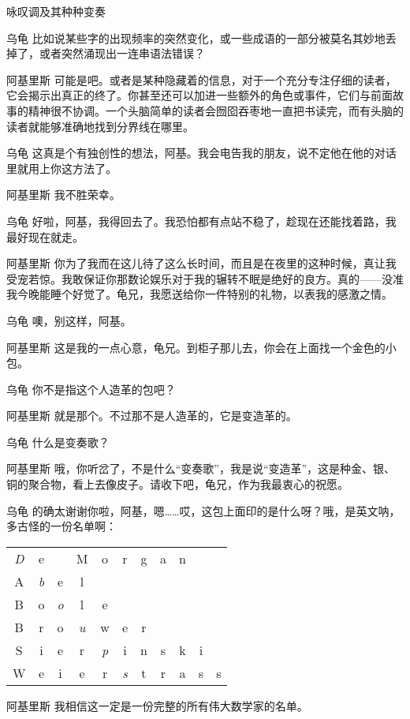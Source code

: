 \begin{dialog}{咏叹调及其种种变奏}
\begin{dialogue}
\item[乌龟]比如说某些字的出现频率的突然变化，或一些成语的一部分被莫名其妙地丢掉了，或者突然涌现出一连串语法错误？

\item[阿基里斯]可能是吧。或者是某种隐藏着的信息，对于一个充分专注仔细的读者，它会揭示出真正的终了。你甚至还可以加进一些额外的角色或事件，它们与前面故事的精神很不协调。一个头脑简单的读者会囫囵吞枣地一直把书读完，而有头脑的读者就能够准确地找到分界线在哪里。

\item[乌龟]这真是个有独创性的想法，阿基。我会电告我的朋友，说不定他在他的对话里就用上你这方法了。

\item[阿基里斯]我不胜荣幸。

\item[乌龟]好啦，阿基，我得回去了。我恐怕都有点站不稳了，趁现在还能找着路，我最好现在就走。

\item[阿基里斯]你为了我而在这儿待了这么长时间，而且是在夜里的这种时候，真让我受宠若惊。我敢保证你那数论娱乐对于我的辗转不眠是绝好的良方。真的——没准我今晚能睡个好觉了。龟兄，我愿送给你一件特别的礼物，以表我的感激之情。

\item[乌龟]噢，别这样，阿基。

\item[阿基里斯]这是我的一点心意，龟兄。到柜子那儿去，你会在上面找一个金色的小包。


\item[乌龟]你不是指这个人造革的包吧？

\item[阿基里斯]就是那个。不过那不是人造革的，它是变造革的。

\item[乌龟]什么是变奏歌？

\item[阿基里斯]哦，你听岔了，不是什么“变奏歌”，我是说“变造革”，这是种金、银、铜的聚合物，看上去像皮子。请收下吧，龟兄，作为我最衷心的祝愿。

\item[乌龟]的确太谢谢你啦，阿基，嗯……哎，这包上面印的是什么呀？哦，是英文呐，多古怪的一份名单啊：
\begin{center}
\setlength\tabcolsep{1pt}
\begin{tabular}{*{11}c}
\emph{D}&e&&M&o&r&g&a&n\\
A&\emph{b}&e&l\\
B&o&\emph{o}&l&e\\
B&r&o&\emph{u}&w&e&r\\
S&i&e&r&\emph{p}&i&n&s&k&i\\
W&e&i&e&r&\emph{s}&t&r&a&s&s
\end{tabular}
\end{center}
\item[阿基里斯]我相信这一定是一份完整的所有伟大数学家的名单。


\end{dialogue}
\end{dialog}
